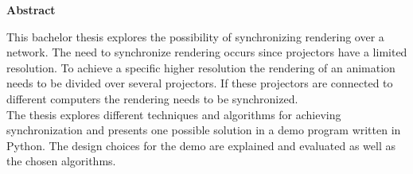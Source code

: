 \mbox{}
\vspace{3cm}
\begin{center}
\begin{minipage}[center]{0.80\textwidth}

\begin{center}
{\normalsize \textbf{Abstract}}
\end{center}
This bachelor thesis explores the possibility of synchronizing rendering over a network. The need to synchronize rendering occurs since projectors have a limited resolution. To achieve a specific higher resolution the rendering of an animation needs to be divided over several projectors. If these projectors are connected to different computers the rendering needs to be synchronized. 
\\

The thesis explores different techniques and algorithms for achieving synchronization and presents one possible solution in a demo program written in Python. The design choices for the demo are explained and evaluated as well as the chosen algorithms. 
\end{minipage}
\end{center}
